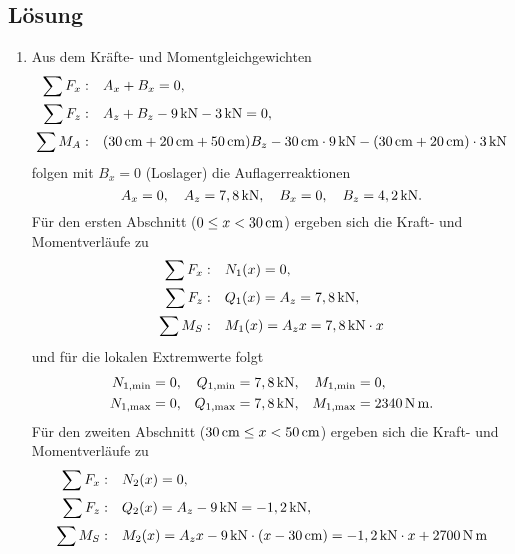 \documentclass{exercise}
\begin{document}
    \subsection*{Lösung}
    \begin{enumerate}
        \item Aus dem Kräfte- und Momentgleichgewichten
        \begin{align*}
            \sum F_x: &\quad A_x + B_x = 0,\\
            \sum F_z: &\quad A_z + B_z - 9\sis{\kilo\newton} - 3\sis{\kilo\newton} = 0,\\
            \sum M_A: &\quad \parentheses*{30\sis{\centi\meter} + 20\sis{\centi\meter} + 50\sis{\centi\meter}}B_z - 30\sis{\centi\meter} \cdot 9\sis{\kilo\newton} - \parentheses*{30\sis{\centi\meter} + 20\sis{\centi\meter}} \cdot 3\sis{\kilo\newton}
        \end{align*}
        folgen mit \(B_x = 0\) (Loslager) die Auflagerreaktionen
        \[
            A_x = 0, \quad A_z = 7,8\,\si{\kilo\newton}, \quad B_x = 0, \quad B_z = 4,2\,\si{\kilo\newton}.
        \]
        Für den ersten Abschnitt (\(0 \le x < 30\,\si{\centi\meter}\)) ergeben sich die Kraft- und Momentverläufe zu
        \begin{align*}
            \sum F_x: &\quad N_1\parentheses*{x} = 0,\\
            \sum F_z: &\quad Q_1\parentheses*{x} = A_z = 7,8\sis{\kilo\newton},\\
            \sum M_S: &\quad M_1\parentheses*{x} = A_z x = 7,8\sis{\kilo\newton} \cdot x
        \end{align*}
        und für die lokalen Extremwerte folgt
        \begin{align*}
            N_{1, \text{min}} &= 0, & Q_{1, \text{min}} &= 7,8\,\si{\kilo\newton}, & M_{1, \text{min}} &= 0,\\
            N_{1, \text{max}} &= 0, & Q_{1, \text{max}} &= 7,8\,\si{\kilo\newton}, & M_{1, \text{max}} &= 2340\,\si{\newton\meter}.
        \end{align*}
        Für den zweiten Abschnitt (\(30\,\si{\centi\meter} \le x < 50\,\si{\centi\meter}\)) ergeben sich die Kraft- und Momentverläufe zu
        \begin{align*}
            \sum F_x: &\quad N_2\parentheses*{x} = 0,\\
            \sum F_z: &\quad Q_2\parentheses*{x} = A_z - 9\sis{\kilo\newton} = -1,2\sis{\kilo\newton},\\
            \sum M_S: &\quad M_2\parentheses*{x} = A_z x - 9\sis{\kilo\newton} \cdot \parentheses*{x - 30\sis{\centi\meter}} = -1,2\sis{\kilo\newton} \cdot x + 2700\sis{\newton\meter}

\end{align*}
\end{enumerate}
\end{document}
